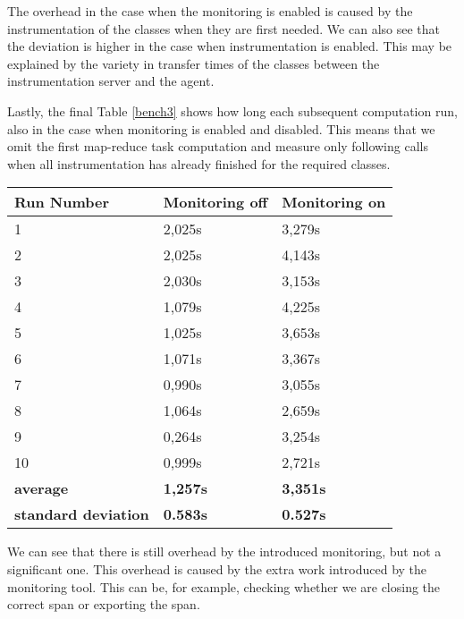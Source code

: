 The overhead in the case when the monitoring is enabled is caused by the instrumentation of the classes when they are first needed. We can also see that the deviation is higher in the case when instrumentation is enabled. This may be explained by the variety in transfer times of the classes between the instrumentation server and the agent.

Lastly, the final Table \ref{bench3} shows how long each subsequent computation run, also in the case when monitoring is enabled and disabled. This means that we omit the first map-reduce task computation and measure only following calls when all instrumentation has already finished for the required classes.
\begin{center}
	\begin{tabular}{ l l l }
		\hline
		Run Number & Monitoring off & Monitoring on \\ \hline
1&	2,025s&	3,279s \\ 
2&	2,025s&	4,143s \\
3&	2,030s	&3,153s \\
4&	1,079s&	4,225s \\
5&	1,025s&	3,653s \\
6&	1,071s	&3,367s \\
7	&0,990s&	3,055s \\
8&	1,064s	&2,659s \\
9&	0,264s&	3,254s \\
10&	0,999s&	2,721s \\

\hline  
\textbf{average} & \textbf{1,257s} & \textbf{3,351s} \\
\textbf{standard deviation} & \textbf{0.583s} & \textbf{0.527s} \\
\end{tabular}
\label{bench3}

\end{center}

We can see that there is still overhead by the introduced monitoring, but not a significant one. This overhead is caused by the extra work introduced by the monitoring tool. This can be, for example, checking whether we are closing the correct span or exporting the span.

